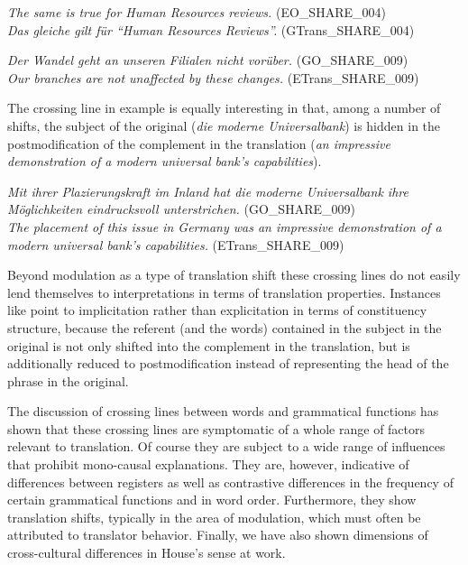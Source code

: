 \documentclass[output=paper]{LSP/langsci}
\begin{document}
\ea \label{ex:culo:33}
    \ea \textit{The same is true for Human Resources reviews.} (EO\_SHARE\_004)\\
    \ex \textit{Das gleiche gilt für ``Human Resources Reviews''.} (GTrans\_SHARE\_004) 
    \z
\z


\ea \label{ex:culo:34}
    \ea \textit{Der Wandel geht an unseren Filialen nicht vorüber.} (GO\_SHARE\_009)\\
    \ex \textit{Our branches are not unaffected by these changes.} (ETrans\_SHARE\_009) 
    \z
\z
 
The crossing line in example  is equally interesting in that, among a number of shifts, the subject of the original (\textit{die moderne Universalbank}) is hidden in the postmodification of the complement in the translation (\textit{an impressive demonstration of a modern universal bank's capabilities}). 

\ea \label{ex:culo:35}
     \ea \textit{Mit ihrer Plazierungskraft im Inland hat die moderne Universalbank ihre Möglichkeiten eindrucksvoll unterstrichen.} (GO\_SHARE\_009)\\
     \ex \textit{The placement of this issue in Germany was an impressive demonstration of a modern   universal bank's capabilities.} (ETrans\_SHARE\_009)
     \z
\z

Beyond modulation as a type of translation shift these crossing lines do not easily lend themselves to interpretations in terms of translation properties. Instances like  point to implicitation rather than explicitation in terms of constituency structure, because the referent (and the words) contained in the subject in the original is not only shifted into the complement in the translation, but is additionally reduced to postmodification instead of representing the head of the phrase in the original.

The discussion of crossing lines between words and grammatical functions has shown that these crossing lines are symptomatic of a whole range of factors relevant to translation. Of course they are subject to a wide range of influences that prohibit mono-causal explanations. They are, however, indicative of differences between registers as well as contrastive differences in the frequency of certain grammatical functions and in word order. Furthermore, they show translation shifts, typically in the area of modulation, which must often be attributed to translator behavior. Finally, we have also shown dimensions of cross-cultural differences in House's sense at work.
\end{document}
